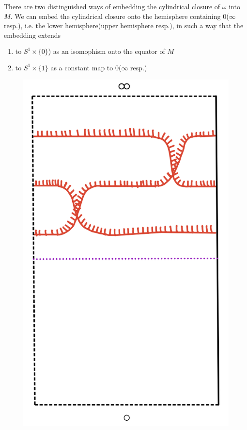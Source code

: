 There are two distinguished ways of embedding the cylindrical closure of $\omega$ into $M$. We can embed the cylindrical closure onto the hemisphere containing $0$($\infty$ resp.), i.e. the lower hemisphere(upper hemisphere resp.), in such a way that the embedding extends

\begin{enumerate}[label = (\roman*)]
\item to $S^1 \times \{ 0 \}$) as an isomophism onto the equator of $M$
\item to  $S^1 \times \{ 1 \}$ as a constant map to $0$($\infty$ resp.)
\end{enumerate}

\begin{figure}[H]
    \centering
    \includegraphics[scale = 0.55]{diagrams/natural_alternating_diagrams/4-1.png} 
    \caption{}
    \label{fig:your-label}
\end{figure}

